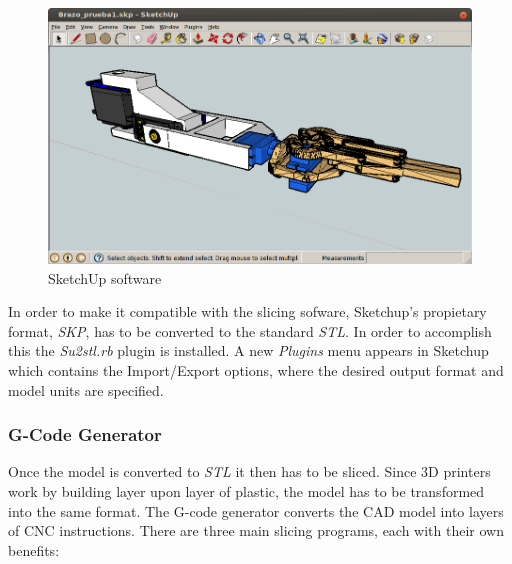 			\begin{figure}[H]
				\centering
				\includegraphics[scale=0.4]{images/ProjectComponents/sketchup-arm.png}
				\caption{SketchUp software}
				\label{sketchup}
			\end{figure}
			\bigskip

		In order to make it compatible with the slicing sofware, Sketchup's propietary format, \textit{SKP}, has to be converted to the standard \textit{STL}. In order to accomplish this the \textit{Su2stl.rb} plugin is installed. A new \textit{Plugins} menu appears in Sketchup which contains the Import/Export options, where the desired output format and model units are specified.



		\subsubsection{G-Code Generator} 
		Once the model is converted to \textit{STL} it then has to be sliced. Since 3D printers work by building layer upon layer of plastic, the model has to be transformed into the same format. The G-code generator converts the CAD model into layers of CNC instructions. There are three main slicing programs, each with their own benefits:

